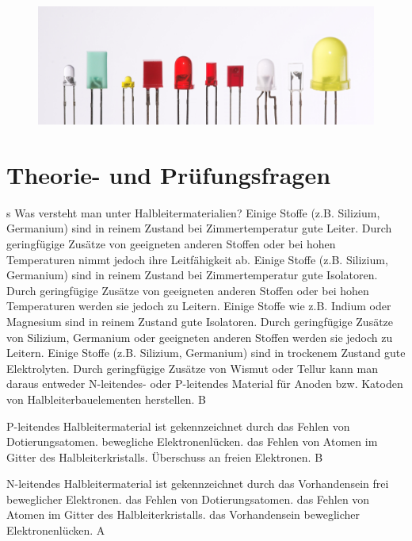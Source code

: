 \begin{figure}
 \vspace{-6cm}
 \includegraphics[scale=0.25]{Diode/Bilder/Verschiedene_LEDs.jpg}
 \vspace{-6cm}
\end{figure}

\section*{Theorie- und Prüfungsfragen} 


s
{Was versteht man unter Halbleitermaterialien?}%
{Einige Stoffe (z.B. Silizium, Germanium) sind in reinem Zustand bei Zimmertemperatur gute Leiter. Durch geringfügige Zusätze von geeigneten anderen Stoffen oder bei hohen Temperaturen nimmt jedoch ihre Leitfähigkeit ab.}%
{Einige Stoffe (z.B. Silizium, Germanium) sind in reinem Zustand bei Zimmertemperatur gute Isolatoren. Durch geringfügige Zusätze von geeigneten anderen Stoffen oder bei hohen Temperaturen werden sie jedoch zu Leitern.}%
{Einige Stoffe wie z.B. Indium oder Magnesium sind in reinem Zustand gute Isolatoren. Durch geringfügige Zusätze von Silizium, Germanium oder geeigneten anderen Stoffen werden sie jedoch zu Leitern.}%
{Einige Stoffe (z.B. Silizium, Germanium) sind in trockenem Zustand gute Elektrolyten. Durch geringfügige Zusätze von Wismut oder Tellur kann man daraus entweder N-leitendes- oder P-leitendes Material für Anoden bzw. Katoden von Halbleiterbauelementen herstellen.}%
{B}%

{P-leitendes Halbleitermaterial ist gekennzeichnet durch}%
{das Fehlen von Dotierungsatomen.}%
{bewegliche Elektronenlücken.}%
{das Fehlen von Atomen im Gitter des Halbleiterkristalls.}%
{Überschuss an freien Elektronen.}%
{B}%

{N-leitendes Halbleitermaterial ist gekennzeichnet durch}%
{das Vorhandensein frei beweglicher Elektronen.}%
{das Fehlen von Dotierungsatomen.}%
{das Fehlen von Atomen im Gitter des Halbleiterkristalls.}%
{das Vorhandensein beweglicher Elektronenlücken.}%
{A}%


